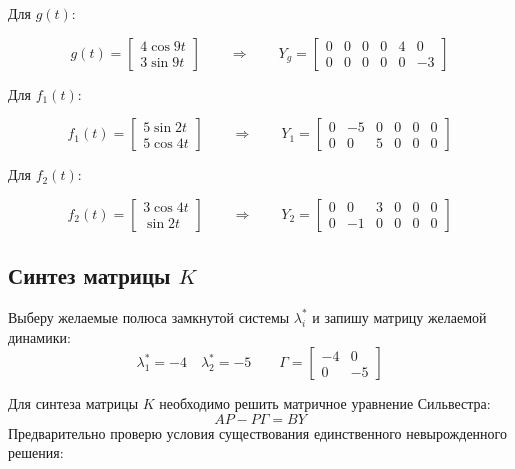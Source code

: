 \documentclass[a4paper,12pt]{article}
\begin{document}
	Для $g(t)$:
	
	\[
	g(t) = 
	\begin{bmatrix}
		4\cos 9t \\
		3\sin 9t
	\end{bmatrix}
	\qquad \Longrightarrow \qquad Y_g = 
	\begin{bmatrix}
		0 & 0 & 0 & 0 & 4 & 0 \\
		0 & 0 & 0 & 0 & 0 & -3
	\end{bmatrix}
	\]
	
	Для $f_1(t)$:
	
	\[
	f_1(t) = 
	\begin{bmatrix}
		5\sin 2t \\
		5\cos 4t
	\end{bmatrix}
	\qquad \Longrightarrow \qquad
	Y_1 = 
	\begin{bmatrix}
		0 & -5 & 0 & 0 & 0 & 0 \\
		0 & 0 & 5 & 0 & 0 & 0
	\end{bmatrix}
	\]
	
	Для $f_2(t)$:
	
	\[
	f_2(t) = 
	\begin{bmatrix}
		3\cos 4t \\
		\sin 2t
	\end{bmatrix}
	\qquad \Longrightarrow \qquad
	Y_2 = 
	\begin{bmatrix}
		0 & 0 & 3 & 0 & 0 & 0 \\
		0 & -1 & 0 & 0 & 0 & 0
	\end{bmatrix}
	\]
	
	\subsection{Синтез матрицы \(K\)}
	

Выберу желаемые полюса замкнутой системы $\lambda_i^*$ и запишу матрицу желаемой динамики:
\[
\lambda_1^* = -4 \quad \lambda_2^* = -5 \qquad
\Gamma = \begin{bmatrix} -4 & 0 \\ 0 & -5 \end{bmatrix}
\]

Для синтеза матрицы $K$ необходимо решить матричное уравнение Сильвестра:
\[
AP - P\Gamma = BY
\]
Предварительно проверю условия существования единственного невырожденного решения:
\end{document}
